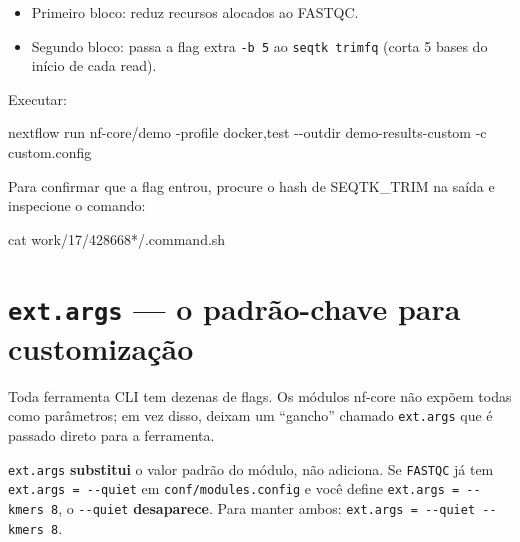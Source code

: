 \documentclass[
  brazilian,
  letterpaper,
  DIV=11,
  numbers=noendperiod]{scrreprt}
\newenvironment{Shaded}{\begin{snugshade}}{\end{snugshade}}
\newcommand{\AttributeTok}[1]{\textcolor[rgb]{0.40,0.45,0.13}{#1}}
\newcommand{\ExtensionTok}[1]{\textcolor[rgb]{0.00,0.23,0.31}{#1}}
\newcommand{\FunctionTok}[1]{\textcolor[rgb]{0.28,0.35,0.67}{#1}}
\newcommand{\NormalTok}[1]{\textcolor[rgb]{0.00,0.23,0.31}{#1}}
\newcommand{\PreprocessorTok}[1]{\textcolor[rgb]{0.68,0.00,0.00}{#1}}
\providecommand{\tightlist}{%
  \setlength{\itemsep}{0pt}\setlength{\parskip}{0pt}}
\begin{document}
\begin{itemize}
\tightlist
\item
  Primeiro bloco: reduz recursos alocados ao FASTQC.
\item
  Segundo bloco: passa a flag extra \texttt{-b\ 5} ao
  \texttt{seqtk\ trimfq} (corta 5 bases do início de cada read).
\end{itemize}

Executar:

\begin{Shaded}
\begin{Highlighting}[]
\ExtensionTok{nextflow}\NormalTok{ run nf{-}core/demo }\AttributeTok{{-}profile}\NormalTok{ docker,test }\AttributeTok{{-}{-}outdir}\NormalTok{ demo{-}results{-}custom }\AttributeTok{{-}c}\NormalTok{ custom.config}
\end{Highlighting}
\end{Shaded}

Para confirmar que a flag entrou, procure o hash de SEQTK\_TRIM na saída
e inspecione o comando:

\begin{Shaded}
\begin{Highlighting}[]
\FunctionTok{cat}\NormalTok{ work/17/428668}\PreprocessorTok{*}\NormalTok{/.command.sh}
\end{Highlighting}
\end{Shaded}

\section{\texorpdfstring{\texttt{ext.args} --- o padrão-chave para
customização}{ext.args --- o padrão-chave para customização}}\label{ext.args-o-padruxe3o-chave-para-customizauxe7uxe3o}

Toda ferramenta CLI tem dezenas de flags. Os módulos nf-core não expõem
todas como parâmetros; em vez disso, deixam um ``gancho'' chamado
\texttt{ext.args} que é passado direto para a ferramenta.

\begin{tcolorbox}[enhanced jigsaw, arc=.35mm, bottomrule=.15mm, bottomtitle=1mm, breakable, colback=white, colbacktitle=quarto-callout-warning-color!10!white, colframe=quarto-callout-warning-color-frame, coltitle=black, left=2mm, leftrule=.75mm, opacityback=0, opacitybacktitle=0.6, rightrule=.15mm, title=\textcolor{quarto-callout-warning-color}{\faExclamationTriangle}\hspace{0.5em}{Aviso}, titlerule=0mm, toprule=.15mm, toptitle=1mm]

\texttt{ext.args} \textbf{substitui} o valor padrão do módulo, não
adiciona. Se \texttt{FASTQC} já tem
\texttt{ext.args\ =\ \textquotesingle{}-\/-quiet\textquotesingle{}} em
\texttt{conf/modules.config} e você define
\texttt{ext.args\ =\ \textquotesingle{}-\/-kmers\ 8\textquotesingle{}},
o \texttt{-\/-quiet} \textbf{desaparece}. Para manter ambos:
\texttt{ext.args\ =\ \textquotesingle{}-\/-quiet\ -\/-kmers\ 8\textquotesingle{}}.

\end{tcolorbox}
\end{document}

